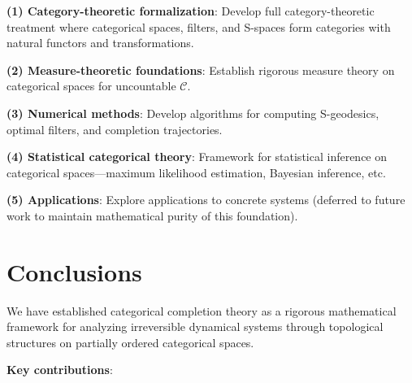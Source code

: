 \documentclass[12pt,a4paper]{article}
\begin{document}
\textbf{(1) Category-theoretic formalization}: Develop full category-theoretic treatment where categorical spaces, filters, and S-spaces form categories with natural functors and transformations.

\textbf{(2) Measure-theoretic foundations}: Establish rigorous measure theory on categorical spaces for uncountable $\mathcal{C}$.

\textbf{(3) Numerical methods}: Develop algorithms for computing S-geodesics, optimal filters, and completion trajectories.

\textbf{(4) Statistical categorical theory}: Framework for statistical inference on categorical spaces—maximum likelihood estimation, Bayesian inference, etc.

\textbf{(5) Applications}: Explore applications to concrete systems (deferred to future work to maintain mathematical purity of this foundation).

\section{Conclusions}

We have established categorical completion theory as a rigorous mathematical framework for analyzing irreversible dynamical systems through topological structures on partially ordered categorical spaces.

\textbf{Key contributions}:
\end{document}
